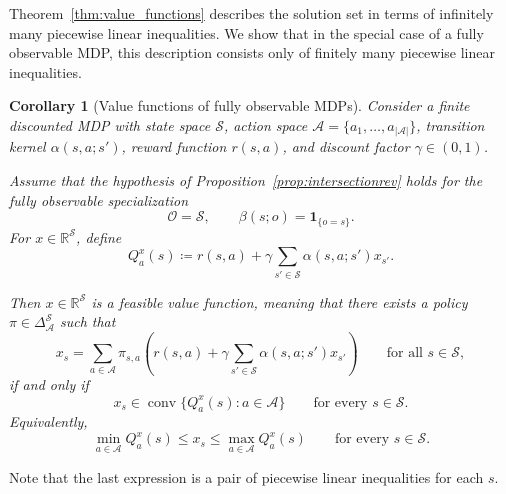 \documentclass{article}
\newtheorem{corollary}[theorem]{Corollary}
\theoremstyle{definition}
\theoremstyle{remark}
\begin{document}
Theorem~\ref{thm:value_functions} describes the solution set in terms of infinitely many piecewise linear inequalities. We show that in the special case of a fully observable MDP, this description consists only of finitely many piecewise linear inequalities.  

\begin{corollary}[Value functions of fully observable MDPs]
\label{cor:value_functions_mdp}
Consider a finite discounted MDP with state space $\mathcal S$, action space $\mathcal A=\{a_1,\ldots,a_{\vert \mathcal A\vert }\}$, transition kernel $\alpha(s,a;s')$, reward function $r(s,a)$, and discount factor $\gamma\in(0,1)$.

Assume that the hypothesis of Proposition~\ref{prop:intersectionrev} holds for the fully observable specialization
\[
    \mathcal O=\mathcal S,
    \qquad
    \beta(s;o)=\mathbf 1_{\{o=s\}} .
\]
For $x\in\mathbb R^{\mathcal S}$, define
\[
    Q_a^x(s)
    \coloneqq
    r(s,a)+\gamma\sum_{s'\in\mathcal S}\alpha(s,a;s')x_{s'} .
\]

Then $x\in\mathbb R^{\mathcal S}$ is a feasible value function, meaning that
there exists a policy $\pi\in \Delta^{\mathcal S}_{\mathcal A}$ such that
\[
    x_s
    =
    \sum_{a\in\mathcal A}\pi_{s,a}
    \left(
        r(s,a)+\gamma\sum_{s'\in\mathcal S}\alpha(s,a;s')x_{s'}
    \right)
    \qquad\text{for all }s\in\mathcal S,
\]
if and only if
\[
    x_s\in \operatorname{conv}\{Q_a^x(s):a\in\mathcal A\}
    \qquad\text{for every }s\in\mathcal S.
\]
Equivalently,
\[
    \min_{a\in\mathcal A} Q_a^x(s)
    \le x_s \le
    \max_{a\in\mathcal A} Q_a^x(s)
    \qquad\text{for every }s\in\mathcal S.
\]
\end{corollary}
Note that the last expression is a pair of piecewise linear inequalities for each $s$. 
\end{document}
